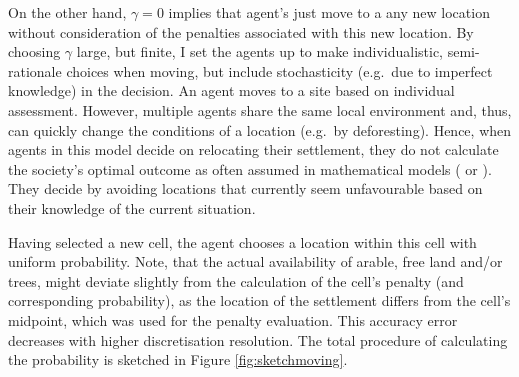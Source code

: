 On the other hand, $\gamma=0$ implies that agent's just move to a any new location without consideration of the penalties associated with this new location.
By choosing $\gamma$ large, but finite, I set the agents up to make individualistic, semi-rationale choices when moving, but include stochasticity (e.g.\ due to imperfect knowledge) in the decision.
An agent moves to a site based on individual assessment.
However, multiple agents share the same local environment and, thus, can quickly change the conditions of a location (e.g.\ by deforesting). 
Hence, when agents in this model decide on relocating their settlement, they do not calculate the society's optimal outcome as often assumed in mathematical models (\citet{Good2006} or \citet{Bookstaber2019}).
They decide by avoiding locations that currently seem unfavourable based on their knowledge of the current situation.

Having selected a new cell, the agent chooses a location within this cell with uniform probability.
Note, that the actual availability of arable, free land and/or trees, might deviate slightly from the calculation of the cell's penalty (and corresponding probability), as the location of the settlement differs from the cell's midpoint, which was used for the penalty evaluation.
This accuracy error decreases with higher discretisation resolution.
The total procedure of calculating the probability is sketched in Figure \ref{fig:sketchmoving}.

